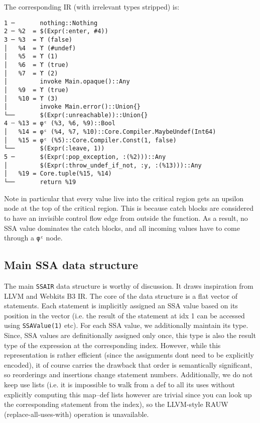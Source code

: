 The corresponding IR (with irrelevant types stripped) is:




\begin{lstlisting}
1 ─       nothing::Nothing
2 ─ %2  = $(Expr(:enter, #4))
3 ─ %3  = ϒ (false)
│   %4  = ϒ (#undef)
│   %5  = ϒ (1)
│   %6  = ϒ (true)
│   %7  = ϒ (2)
│         invoke Main.opaque()::Any
│   %9  = ϒ (true)
│   %10 = ϒ (3)
│         invoke Main.error()::Union{}
└──       $(Expr(:unreachable))::Union{}
4 ┄ %13 = φᶜ (%3, %6, %9)::Bool
│   %14 = φᶜ (%4, %7, %10)::Core.Compiler.MaybeUndef(Int64)
│   %15 = φᶜ (%5)::Core.Compiler.Const(1, false)
└──       $(Expr(:leave, 1))
5 ─       $(Expr(:pop_exception, :(%2)))::Any
│         $(Expr(:throw_undef_if_not, :y, :(%13)))::Any
│   %19 = Core.tuple(%15, %14)
└──       return %19
\end{lstlisting}



Note in particular that every value live into the critical region gets an upsilon node at the top of the critical region. This is because catch blocks are considered to have an invisible control flow edge from outside the function. As a result, no SSA value dominates the catch blocks, and all incoming values have to come through a \texttt{φᶜ} node.



\hypertarget{13190851783504287053}{}


\subsection{Main SSA data structure}



The main \texttt{SSAIR} data structure is worthy of discussion. It draws inspiration from LLVM and Webkit{\textquotesingle}s B3 IR. The core of the data structure is a flat vector of statements. Each statement is implicitly assigned an SSA value based on its position in the vector (i.e. the result of the statement at idx 1 can be accessed using \texttt{SSAValue(1)} etc). For each SSA value, we additionally maintain its type. Since, SSA values are definitionally assigned only once, this type is also the result type of the expression at the corresponding index. However, while this representation is rather efficient (since the assignments don{\textquotesingle}t need to be explicitly encoded), it of course carries the drawback that order is semantically significant, so reorderings and insertions change statement numbers. Additionally, we do not keep use lists (i.e. it is impossible to walk from a def to all its uses without explicitly computing this map–def lists however are trivial since you can look up the corresponding statement from the index), so the LLVM-style RAUW (replace-all-uses-with) operation is unavailable.



